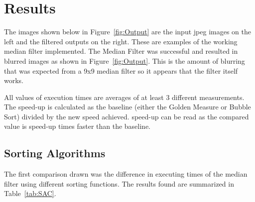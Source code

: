 \section{Results}


The images shown below in Figure~\ref{fig:Output} are the input jpeg images on the left and the filtered outputs on the right. These are examples of the working median filter implemented. The Median Filter was successful and resulted in blurred images as shown in Figure~\ref{fig:Output}. This is the amount of blurring that was expected from a 9x9 median filter so it appears that the filter itself works.

All values of execution times are averages of at least 3 different measurements. The speed-up is calculated as the baseline (either the Golden Measure or Bubble Sort) divided by the new speed achieved. speed-up can be read as the compared value is speed-up times faster than the baseline.

\subsection{Sorting Algorithms}

The first comparison drawn was the difference in executing times of the median filter using different sorting functions. The results found are summarized in Table~\ref{tab:SAC}.



